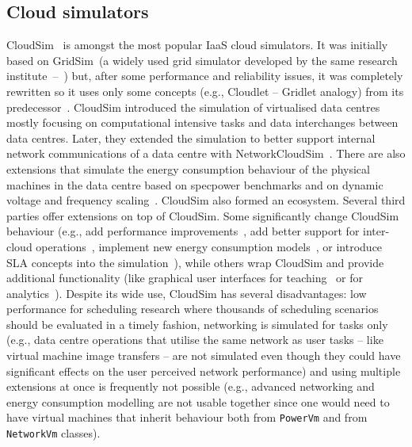 \documentclass[sort, compress, 5p]{elsarticle}
\begin{document}
\begin{description*}
\end{description*}

\subsection{Cloud simulators}


CloudSim~\cite{CloudSim-buyya2009modeling} is amongst the most popular IaaS cloud simulators. It was initially based on GridSim~(a widely used grid simulator developed by the same research institute~--~\cite{GridSIM-buyya2002gridsim}) but, after some performance and reliability issues, it was completely rewritten so it uses only some concepts (e.g., Cloudlet -- Gridlet analogy) from its predecessor~\cite{CloudSim-calheiros2011CloudSim}. CloudSim introduced the simulation of virtualised data centres mostly focusing on computational intensive tasks and data interchanges between data centres. Later, they extended the simulation to better support internal network communications of a data centre with NetworkCloudSim~\cite{CloudSim-garg2011networkCloudSim}. There are also extensions that simulate the energy consumption behaviour of the physical machines in the data centre based on specpower benchmarks and on dynamic voltage and frequency scaling~\cite{CloudSim-beloglazov2012optimal, CloudSimExt-DVFS}. CloudSim also formed an ecosystem. Several third parties offer extensions on top of CloudSim. Some significantly change CloudSim behaviour (e.g., add performance improvements~\cite{CloudSimExt-li2012dartcsim}, add better support for inter-cloud operations~\cite{SIMIC-6531742, SIMIC-6550488}, implement new energy consumption models~\cite{CloudSimExt-shi2011energy}, or introduce SLA concepts into the simulation~\cite{CloudSimExt-SLA}), while others wrap CloudSim and provide additional functionality (like graphical user interfaces for teaching~\cite{CloudSimExt-jararweh2012teachcloud} or for analytics~\cite{CloudSimExt-wickremasinghe2010cloudanalyst,CloudSimExt-CloudReports}). Despite its wide use, CloudSim has several disadvantages:  low performance for scheduling research where thousands of scheduling scenarios should be evaluated in a timely fashion,  networking is simulated for tasks only (e.g., data centre operations that utilise the same network as user tasks -- like virtual machine image transfers -- are not simulated even though they could have significant effects on the user perceived network performance) and  using multiple extensions at once is frequently not possible (e.g., advanced networking and energy consumption modelling are not usable together since one would need to have virtual machines that inherit behaviour both from \verb+PowerVm+ and from \verb+NetworkVm+ classes).
\end{document}
